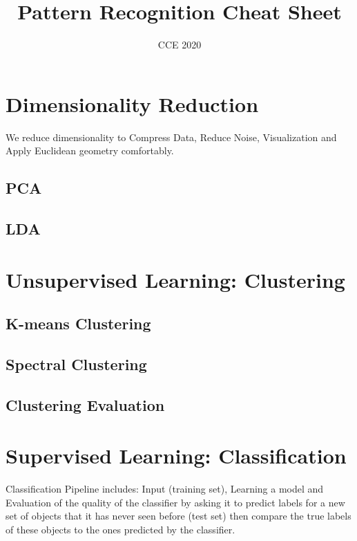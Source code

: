 \documentclass{article}
\title{Pattern Recognition Cheat Sheet}
\author{CCE 2020}
\begin{document}
\maketitle
\tableofcontents

\section{Dimensionality Reduction}
    We reduce dimensionality to Compress Data, 
    Reduce Noise, Visualization and Apply Euclidean geometry comfortably.
    \subsection{PCA}
        
    \subsection{LDA}
        

\section{Unsupervised Learning: Clustering}
    \subsection{K-means Clustering}
        
    \subsection{Spectral Clustering }
        
    \subsection{Clustering Evaluation}
        
    \newpage

\section{Supervised Learning: Classification}
    Classification Pipeline includes: Input (training set), Learning a model and Evaluation of the quality of the classifier by asking it to predict labels for a new set of objects that it
    has never seen before (test set) then compare the true labels of these objects to the ones predicted by the classifier.
\end{document}
